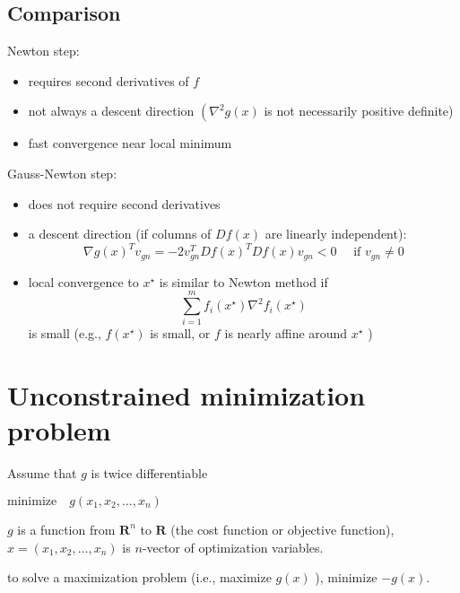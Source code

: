 \subsection{Comparison}

Newton step:
\begin{itemize}
    \item requires second derivatives of $ f $
    \item not always a descent direction $ \left(\nabla^{2} g(x)\right. $ is not necessarily positive definite)
    \item fast convergence near local minimum
\end{itemize}


Gauss-Newton step:
\begin{itemize}
    \item does not require second derivatives
    \item a descent direction (if columns of $ D f(x) $ are linearly independent):
    \begin{equation}
    \nabla g(x)^{T} v_{{gn}}=-2 v_{{gn}}^{T} D f(x)^{T} D f(x) v_{{gn}}<0 \quad \text { if } v_{{gn}} \neq 0
    \end{equation}
    \item local convergence to $ x^{\star} $ is similar to Newton method if
\begin{equation}
\sum_{i=1}^{m} f_{i}\left(x^{\star}\right) \nabla^{2} f_{i}\left(x^{\star}\right)
\end{equation}
is small (e.g., $ f\left(x^{\star}\right) $ is small, or $ f $ is nearly affine around $ x^{\star} $ )
\end{itemize}


\section{Unconstrained minimization problem}

\begin{problem}
    Assume that $ g $ is twice differentiable

    $\text{minimize} \quad g\left(x_{1}, x_{2}, \ldots, x_{n}\right) $

    $ g $ is a function from $ \mathbf{R}^{n} $ to $ \mathbf{R} $ (the cost function or objective function), $ x=\left(x_{1}, x_{2}, \ldots, x_{n}\right) $ is $ n $-vector of optimization variables.
\end{problem}

to solve a maximization problem (i.e., maximize $ g(x) $ ), minimize $ -g(x) $.

